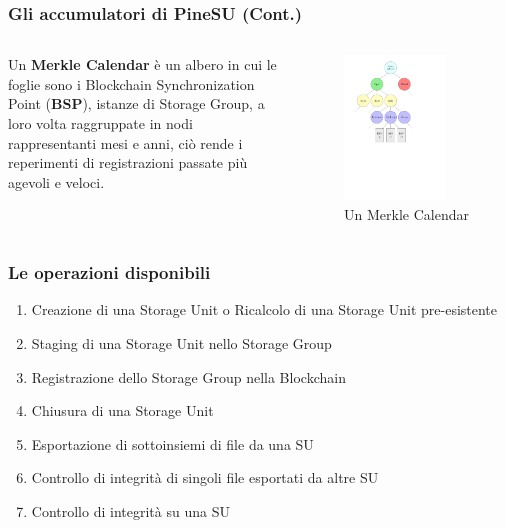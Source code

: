 \documentclass{beamer}
\begin{document}
\begin{frame}
	\frametitle{Gli accumulatori di PineSU (Cont.)}
	\begin{columns}
		Un \textbf{Merkle Calendar} è un albero in cui le foglie sono
		i Blockchain Synchronization Point (\textbf{BSP}), istanze di
		Storage Group, a loro volta raggruppate in nodi rappresentanti
		mesi e anni, ciò rende i reperimenti di registrazioni passate
		più agevoli e veloci.
		\centering
		\begin{figure}
			\includegraphics[width=0.8\textwidth]{figures/mc1.pdf}
			\caption{Un Merkle Calendar}
		\end{figure} 
	\end{columns}
\end{frame}

\begin{frame}
	\frametitle{Le operazioni disponibili}
	\begin{enumerate}[<+->]
		\item Creazione di una Storage Unit o Ricalcolo di una Storage Unit pre-esistente
		\item Staging di una Storage Unit nello Storage Group
		\item Registrazione dello Storage Group nella Blockchain
		\item Chiusura di una Storage Unit
		\item Esportazione di sottoinsiemi di file da una SU
		\item Controllo di integrità di singoli file esportati da altre SU
		\item Controllo di integrità su una SU
	\end{enumerate}
\end{frame}
\end{document}
